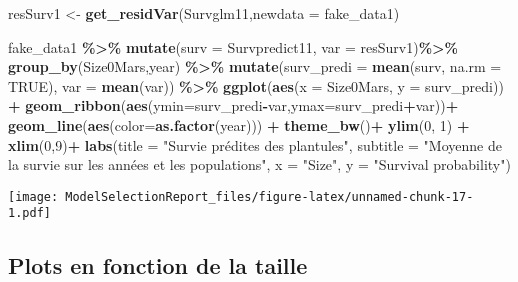 \documentclass[
]{article}
\newenvironment{Shaded}{\begin{snugshade}}{\end{snugshade}}
\newcommand{\AttributeTok}[1]{\textcolor[rgb]{0.13,0.29,0.53}{#1}}
\newcommand{\ConstantTok}[1]{\textcolor[rgb]{0.56,0.35,0.01}{#1}}
\newcommand{\DecValTok}[1]{\textcolor[rgb]{0.00,0.00,0.81}{#1}}
\newcommand{\FunctionTok}[1]{\textcolor[rgb]{0.13,0.29,0.53}{\textbf{#1}}}
\newcommand{\NormalTok}[1]{#1}
\newcommand{\OtherTok}[1]{\textcolor[rgb]{0.56,0.35,0.01}{#1}}
\newcommand{\SpecialCharTok}[1]{\textcolor[rgb]{0.81,0.36,0.00}{\textbf{#1}}}
\newcommand{\StringTok}[1]{\textcolor[rgb]{0.31,0.60,0.02}{#1}}
\begin{document}
\begin{Shaded}
\begin{Highlighting}[]
\NormalTok{resSurv1 }\OtherTok{\textless{}{-}} \FunctionTok{get\_residVar}\NormalTok{(Survglm11,}\AttributeTok{newdata =}\NormalTok{ fake\_data1)}

\NormalTok{fake\_data1 }\SpecialCharTok{\%\textgreater{}\%}
  \FunctionTok{mutate}\NormalTok{(}\AttributeTok{surv =}\NormalTok{ Survpredict11,}
         \AttributeTok{var =}\NormalTok{ resSurv1)}\SpecialCharTok{\%\textgreater{}\%}
  \FunctionTok{group\_by}\NormalTok{(Size0Mars,year) }\SpecialCharTok{\%\textgreater{}\%} 
  \FunctionTok{mutate}\NormalTok{(}\AttributeTok{surv\_predi =} \FunctionTok{mean}\NormalTok{(surv, }\AttributeTok{na.rm =} \ConstantTok{TRUE}\NormalTok{),}
         \AttributeTok{var =} \FunctionTok{mean}\NormalTok{(var)) }\SpecialCharTok{\%\textgreater{}\%}
  \FunctionTok{ggplot}\NormalTok{(}\FunctionTok{aes}\NormalTok{(}\AttributeTok{x =}\NormalTok{ Size0Mars, }\AttributeTok{y =}\NormalTok{ surv\_predi)) }\SpecialCharTok{+}
  \FunctionTok{geom\_ribbon}\NormalTok{(}\FunctionTok{aes}\NormalTok{(}\AttributeTok{ymin=}\NormalTok{surv\_predi}\SpecialCharTok{{-}}\NormalTok{var,}\AttributeTok{ymax=}\NormalTok{surv\_predi}\SpecialCharTok{+}\NormalTok{var))}\SpecialCharTok{+}
  \FunctionTok{geom\_line}\NormalTok{(}\FunctionTok{aes}\NormalTok{(}\AttributeTok{color=}\FunctionTok{as.factor}\NormalTok{(year))) }\SpecialCharTok{+}
  \FunctionTok{theme\_bw}\NormalTok{()}\SpecialCharTok{+}
  \FunctionTok{ylim}\NormalTok{(}\DecValTok{0}\NormalTok{, }\DecValTok{1}\NormalTok{) }\SpecialCharTok{+}
  \FunctionTok{xlim}\NormalTok{(}\DecValTok{0}\NormalTok{,}\DecValTok{9}\NormalTok{)}\SpecialCharTok{+}
  \FunctionTok{labs}\NormalTok{(}\AttributeTok{title =} \StringTok{"Survie prédites des plantules"}\NormalTok{,}
      \AttributeTok{subtitle =} \StringTok{"Moyenne de la survie sur les années et les populations"}\NormalTok{,}
      \AttributeTok{x =} \StringTok{"Size"}\NormalTok{,}
      \AttributeTok{y =} \StringTok{"Survival probability"}\NormalTok{)}
\end{Highlighting}
\end{Shaded}

\texttt{[image: ModelSelectionReport\_files/figure-latex/unnamed-chunk-17-1.pdf]}

\subsection{Plots en fonction de la
taille}\label{plots-en-fonction-de-la-taille}
\end{document}

